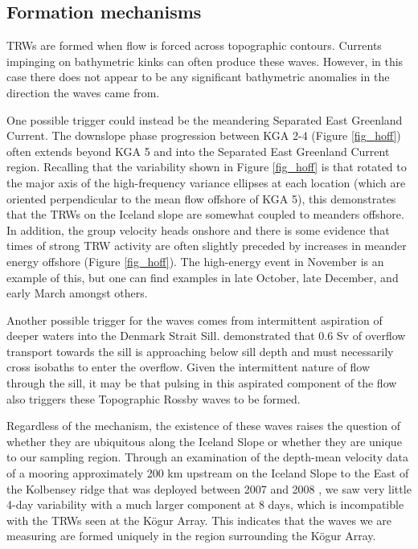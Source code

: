 \documentclass[12pt,titlepage,figuresatend]{article}
\begin{document}
\subsection{Formation mechanisms}

TRWs are formed when flow is forced across topographic contours. Currents impinging on bathymetric kinks can often produce these waves. However, in this case there does not appear to be any significant bathymetric anomalies in the direction the waves came from. 

One possible trigger could instead be the meandering Separated East Greenland Current. The downslope phase progression between KGA 2-4 (Figure \ref{fig_hoff}) often extends beyond KGA 5 and into the Separated East Greenland Current region. Recalling that the variability shown in Figure \ref{fig_hoff} is that rotated to the major axis of the high-frequency variance ellipses at each location (which are oriented perpendicular to the mean flow offshore of KGA 5), this demonstrates that the TRWs on the Iceland slope are somewhat coupled to meanders offshore. In addition, the group velocity heads onshore and there is some evidence that times of strong TRW activity are often slightly preceded by increases in meander energy offshore (Figure \ref{fig_hoff}). The high-energy event in November is an example of this, but one can find examples in late October, late December, and early March amongst others.

Another possible trigger for the waves comes from intermittent aspiration of deeper waters into the Denmark Strait Sill. \cite{Harden2016} demonstrated that 0.6 Sv of overflow transport towards the sill is approaching below sill depth and must necessarily cross isobaths to enter the overflow. Given the intermittent nature of flow through the sill, it may be that pulsing in this aspirated component of the flow also triggers these Topographic Rossby waves to be formed.

Regardless of the mechanism, the existence of these waves raises the question of whether they are ubiquitous along the Iceland Slope or whether they are unique to our sampling region. Through an examination of the depth-mean velocity data of a mooring approximately 200 km upstream on the Iceland Slope to the East of the Kolbensey ridge that was deployed between 2007 and 2008 \cite[]{Jonsson2012}, we saw very little 4-day variability with a much larger component at 8 days, which is incompatible with the TRWs seen at the K\"{o}gur Array. This indicates that the waves we are measuring are formed uniquely in the region surrounding the K\"{o}gur Array.
\end{document}
